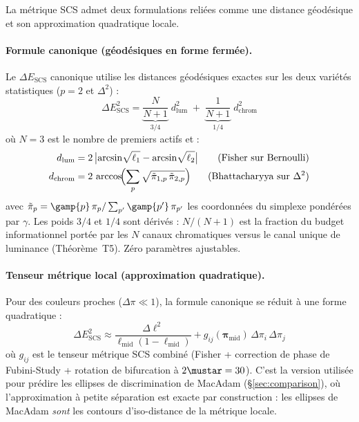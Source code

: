 \documentclass[12pt,a4paper]{article}
\begin{document}
La m\'etrique SCS admet deux formulations reli\'ees comme une distance
g\'eod\'esique et son approximation quadratique locale.

\paragraph{Formule canonique (g\'eod\'esiques en forme ferm\'ee).}
Le $\Delta E_{\mathrm{SCS}}$ canonique utilise les distances
g\'eod\'esiques exactes sur les deux vari\'et\'es statistiques ($p=2$
et $\Delta^2$) :
\begin{equation}
\Delta E_{\mathrm{SCS}}^2 =
  \underbrace{\frac{N}{N+1}}_{3/4}\; d_{\mathrm{lum}}^2 \;+\;
  \underbrace{\frac{1}{N+1}}_{1/4}\; d_{\mathrm{chrom}}^2
\label{eq:de_canonical}
\end{equation}
o\`u $N = 3$ est le nombre de premiers actifs et :
\begin{align}
  d_{\mathrm{lum}} &= 2\,\bigl|\arcsin\!\sqrt{\ell_1}
    - \arcsin\!\sqrt{\ell_2}\bigr|
    & \text{(Fisher sur Bernoulli)} \\
  d_{\mathrm{chrom}} &= 2\,\arccos\!\Bigl(
    \sum_{p} \sqrt{\tilde{\pi}_{1,p}\,\tilde{\pi}_{2,p}}\Bigr)
    & \text{(Bhattacharyya sur $\Delta^2$)}
\end{align}
avec $\tilde{\pi}_p = \gamp{p}\,\pi_p / \sum_{p'}\gamp{p'}\,\pi_{p'}$
les coordonn\'ees du simplexe pond\'er\'ees par $\gamma$. Les poids
$3/4$ et $1/4$ sont d\'eriv\'es : $N/(N+1)$ est la fraction du budget
informationnel port\'ee par les $N$ canaux chromatiques versus le canal
unique de luminance (Th\'eor\`eme~T5). Z\'ero param\`etres ajustables.

\paragraph{Tenseur m\'etrique local (approximation quadratique).}
Pour des couleurs proches ($\Delta\pi \ll 1$), la formule canonique se
r\'eduit \`a une forme quadratique :
\begin{equation}
\Delta E_{\mathrm{SCS}}^2 \approx
  \frac{\Delta\ell^2}{\ell_{\mathrm{mid}}(1-\ell_{\mathrm{mid}})}
  + g_{ij}(\bm{\pi}_{\mathrm{mid}}) \, \Delta\pi_i \, \Delta\pi_j
\label{eq:de_local}
\end{equation}
o\`u $g_{ij}$ est le tenseur m\'etrique SCS combin\'e (Fisher +
correction de phase de Fubini-Study + rotation de bifurcation \`a
$2\mustar = 30$). C'est la version utilis\'ee pour pr\'edire les
ellipses de discrimination de MacAdam (\S\ref{sec:comparison}), o\`u
l'approximation \`a petite s\'eparation est exacte par construction :
les ellipses de MacAdam \emph{sont} les contours d'iso-distance de la
m\'etrique locale.
\end{document}
